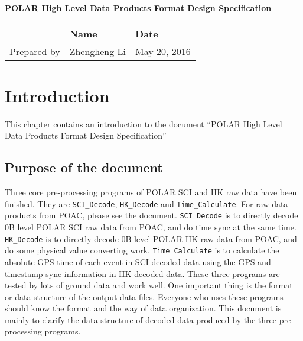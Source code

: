 \documentclass[a4paper, 12pt, onecolumn]{article}
\begin{document}
\begin{titlepage}
  \vspace*{5cm}
  \begin{center}
    \huge \bf POLAR High Level Data Products Format Design Specification
  \end{center}
  \vspace*{6cm}
  \begin{center}
    \large
    \begin{tabular}{ | l | l | l | }
      \hline
      & \bf Name & \bf Date \\ \hline
      Prepared by & Zhengheng Li & May 20, 2016 \\ \hline
    \end{tabular}
  \end{center}
\end{titlepage}

\pagestyle{fancy}
\lhead{}
\rhead{}
\lfoot{\today}
\cfoot{}
\rfoot{\thepage}
\renewcommand{\headrulewidth}{0.4pt}
\renewcommand{\footrulewidth}{0.1pt}

\tableofcontents
\newpage
{}

\section{Introduction}
This chapter contains an introduction to the document ``POLAR High Level Data Products Format Design Specification''

\subsection{Purpose of the document}
Three core pre-processing programs of POLAR SCI and HK raw data have been finished. 
They are \texttt{SCI\_Decode}, \texttt{HK\_Decode} and \texttt{Time\_Calculate}.
For raw data products from POAC, please see the document\cite{POAC-data-products}.
\texttt{SCI\_Decode} is to directly decode 0B level POLAR SCI raw data from POAC, and do time sync at the same time. 
\texttt{HK\_Decode} is to directly decode 0B level POLAR HK raw data from POAC, and do some physical value converting work.
\texttt{Time\_Calculate} is to calculate the absolute GPS time of each event in SCI decoded data using the GPS and timestamp sync information in HK decoded data.
These three programs are tested by lots of ground data and work well. One important thing is the format or data structure of the output data files.
Everyone who uses these programs should know the format and the way of data organization.
This document is mainly to clarify the data structure of decoded data produced by the three pre-processing programs.
\end{document}
